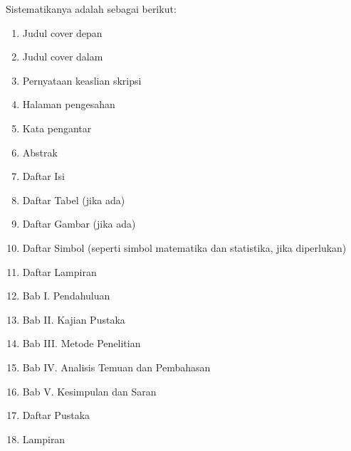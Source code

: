 Sistematikanya adalah sebagai
berikut:
\begin{enumerate}
\item Judul cover depan
\item Judul cover dalam
\item Pernyataan keaslian skripsi
\item Halaman pengesahan
\item Kata pengantar
\item Abstrak
\item Daftar Isi
\item Daftar Tabel (jika ada)
\item Daftar Gambar (jika ada)
\item Daftar Simbol (seperti simbol matematika dan statistika, jika diperlukan)
\item Daftar Lampiran
\item Bab I. Pendahuluan
\item Bab II. Kajian Pustaka
\item Bab III. Metode Penelitian
\item Bab IV. Analisis Temuan dan Pembahasan
\item Bab V. Kesimpulan dan Saran
\item Daftar Pustaka
\item Lampiran
\end{enumerate}

